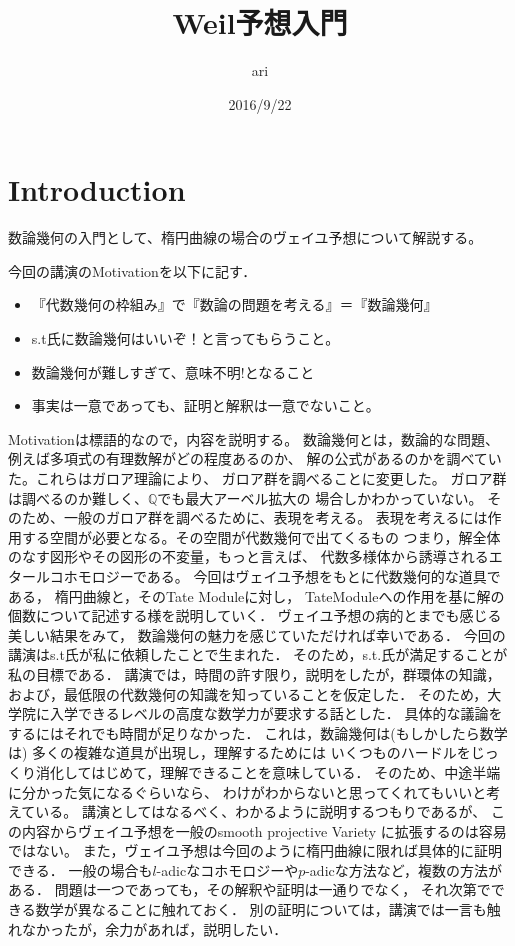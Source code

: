 \documentclass{ujarticle}
\title{Weil予想入門}
\author{ari}
\date{2016/9/22}
\begin{document}
\maketitle
\tableofcontents


\section{Introduction}
\label{sec:Introduction}

数論幾何の入門として、楕円曲線の場合のヴェイユ予想について解説する。

今回の講演のMotivationを以下に記す．
\begin{itemize}
  \setlength{\parskip}{0cm} %
  \setlength{\itemsep}{0cm} %
  \item 『代数幾何の枠組み』で『数論の問題を考える』＝『数論幾何』
  \item s.t氏に数論幾何はいいぞ！と言ってもらうこと。
  \item 数論幾何が難しすぎて、意味不明!となること
  \item 事実は一意であっても、証明と解釈は一意でないこと。
\end{itemize}
Motivationは標語的なので，内容を説明する。
数論幾何とは，数論的な問題、例えば多項式の有理数解がどの程度あるのか、
解の公式があるのかを調べていた。これらはガロア理論により、
ガロア群を調べることに変更した。
ガロア群は調べるのか難しく、$\mathbb{Q}$でも最大アーベル拡大の
場合しかわかっていない。
そのため、一般のガロア群を調べるために、表現を考える。
表現を考えるには作用する空間が必要となる。その空間が代数幾何で出てくるもの
つまり，解全体のなす図形やその図形の不変量，もっと言えば、
代数多様体から誘導されるエタールコホモロジーである。
今回はヴェイユ予想をもとに代数幾何的な道具である，
楕円曲線と，そのTate Moduleに対し，
TateModuleへの作用を基に解の個数について記述する様を説明していく．
ヴェイユ予想の病的とまでも感じる美しい結果をみて，
数論幾何の魅力を感じていただければ幸いである．
今回の講演はs.t氏が私に依頼したことで生まれた．
そのため，s.t.氏が満足することが私の目標である．
講演では，時間の許す限り，説明をしたが，群環体の知識，
および，最低限の代数幾何の知識を知っていることを仮定した．
そのため，大学院に入学できるレベルの高度な数学力が要求する話とした．
具体的な議論をするにはそれでも時間が足りなかった．
これは，数論幾何は(もしかしたら数学は)
多くの複雑な道具が出現し，理解するためには
いくつものハードルをじっくり消化してはじめて，理解できることを意味している．
そのため、中途半端に分かった気になるぐらいなら、
わけがわからないと思ってくれてもいいと考えている。
講演としてはなるべく、わかるように説明するつもりであるが、
この内容からヴェイユ予想を一般のsmooth projective Variety
に拡張するのは容易ではない。
また，ヴェイユ予想は今回のように楕円曲線に限れば具体的に証明できる．
一般の場合も$l$-adicなコホモロジーや$p$-adicな方法など，複数の方法がある．
問題は一つであっても，その解釈や証明は一通りでなく，
それ次第でできる数学が異なることに触れておく．
別の証明については，講演では一言も触れなかったが，余力があれば，説明したい．
\end{document}
